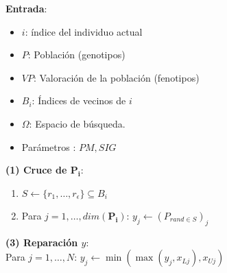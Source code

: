     \noindent\begin{minipage}{\textwidth}
        \begin{algorithm}[H]
        \SetAlgoLined
         \vspace{0.2cm}\textbf{Entrada}:
        \begin{multicols}{2}
        
         \begin{itemize}
             \vspace{0.15cm}\item $i$: índice del individuo actual 
             \vspace{0.15cm}\item $P$: Población (genotipos)
             \vspace{0.15cm}\item $VP$: Valoración de la población (fenotipos)
             \vspace{0.15cm}\item $B_i$: Índices de vecinos de $i$
             \vspace{0.15cm}\item $\Omega$: Espacio de búsqueda.
             \vspace{0.15cm}\item Parámetros : $PM, SIG$
         \end{itemize}
         \end{multicols}
        
        \begin{multicols}{2}
         \vspace{0.3cm} \textbf{(1) Cruce de $\boldsymbol{P_i}$}: 
                \begin{enumerate}
                    \item $S \gets \{r_1, \dots, r_\epsilon\} \subseteq B_i$
                    \item Para $j = 1, \dots, dim(\boldsymbol{P_i})$: $y_j \gets (P_{rand \in S})_{j}$
                \end{enumerate} 
                
                \vspace{0.3cm} \textbf{(3) Reparación $y$}:\\
        Para $j = 1, \dots, N$: $y_j \gets \min ( \max ( y_j , x_{Lj}), x_{Uj})$
                \columnbreak
        

\end{multicols}
\end{algorithm}
\end{minipage}
